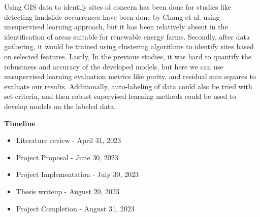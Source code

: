 \documentclass[11pt]{article}
\newcommand{\sect}[1]{\begin{center}\textbf{#1}\end{center}}
\begin{document}
Using GIS data to identify sites of concern has been done for studies like detecting landslide occurrences have 
been done by Chang et al. \cite{chang_du_zhang_huang_chen_li_guo_2020} using unsupervised learning approach,
but it has been relatively absent in the identification of areas suitable for renewable energy farms.
Secondly, after data gathering, it would be trained using clustering algorithms to identify 
sites based on selected features. Lastly, In the previous studies, it was hard to quantify the robustness 
and accuracy of the developed models, but here we can use unsupervised learning evaluation metrics 
like purity, and residual sum squares to evaluate our results. Additionally, auto-labeling of data 
could also be tried with set criteria, and then robust supervised learning methods could be used
to develop models on the labeled data. 
\sect{Timeline}
\begin{itemize}
    \setlength\itemsep{0em}
    \item Literature review - April 31, 2023
    \item Project Proposal - June 30, 2023
    \item Project Implementation - July 30, 2023
    \item Thesis writeup - August 20, 2023
    \item Project Completion - August 31, 2023
\end{itemize}
\vspace{-\baselineskip}
\vspace{-\baselineskip}

\renewcommand{\refname}{{\normalsize \sect{References}}}

\end{document}
